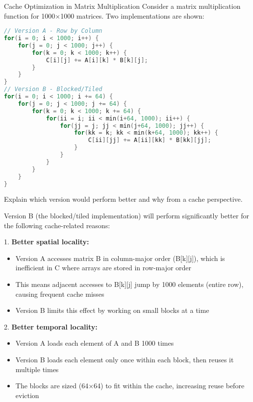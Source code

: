 \begin{example2}{Cache Optimization in Matrix Multiplication}
Consider a matrix multiplication function for 1000×1000 matrices. Two implementations are shown:

\begin{lstlisting}[language=C, style=basesmol]
// Version A - Row by Column
for(i = 0; i < 1000; i++) {
    for(j = 0; j < 1000; j++) {
        for(k = 0; k < 1000; k++) {
            C[i][j] += A[i][k] * B[k][j];
        }
    }
}
// Version B - Blocked/Tiled
for(i = 0; i < 1000; i += 64) {
    for(j = 0; j < 1000; j += 64) {
        for(k = 0; k < 1000; k += 64) {
            for(ii = i; ii < min(i+64, 1000); ii++) {
                for(jj = j; jj < min(j+64, 1000); jj++) {
                    for(kk = k; kk < min(k+64, 1000); kk++) {
                        C[ii][jj] += A[ii][kk] * B[kk][jj];
                    }
                }
            }
        }
    }
}
\end{lstlisting}

Explain which version would perform better and why from a cache perspective.

\tcblower

Version B (the blocked/tiled implementation) will perform significantly better for the following cache-related reasons:

1. \textbf{Better spatial locality:}
   \begin{itemize}
     \item Version A accesses matrix B in column-major order (B[k][j]), which is inefficient in C where arrays are stored in row-major order
     \item This means adjacent accesses to B[k][j] jump by 1000 elements (entire row), causing frequent cache misses
     \item Version B limits this effect by working on small blocks at a time
   \end{itemize}

2. \textbf{Better temporal locality:}
   \begin{itemize}
     \item Version A loads each element of A and B 1000 times
     \item Version B loads each element only once within each block, then reuses it multiple times
     \item The blocks are sized (64×64) to fit within the cache, increasing reuse before eviction
   \end{itemize}


\end{example2}
